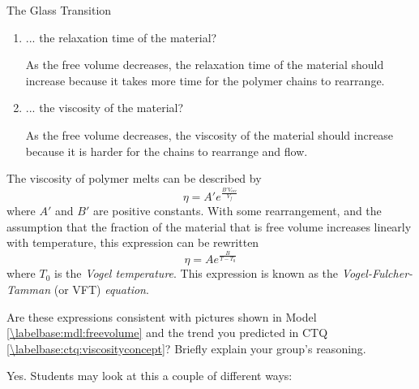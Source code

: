 \begin{activity}{The Glass Transition}
\begin{ctqs}
		\begin{enumerate}
			\item ... the relaxation time of the material?
			
				\begin{solution}[0.5in]
					As the free volume decreases, the relaxation time of the material should increase because it takes more time for the polymer chains to rearrange.
				\end{solution}
			
			\item ... the viscosity of the material?
			
				\begin{solution}[0.5in]
					As the free volume decreases, the viscosity of the material should increase because it is harder for the chains to rearrange and flow.
				\end{solution}
				
		\end{enumerate}
	
\end{ctqs}

\begin{infobox}

	The viscosity of polymer melts can be described by
	\begin{equation*}
		\eta = A' e^{\frac{B' V_{occ}}{V_f}}
	\end{equation*}
	where $A'$ and $B'$ are positive constants.  With some rearrangement, and the assumption that the fraction of the material that is free volume increases linearly with temperature, this expression can be rewritten
	\begin{equation*}
		\eta = A e^{\frac{B}{T-T_0}}
	\end{equation*}
	where $T_0$ is the \emph{Vogel temperature}.  This expression is known as the \emph{Vogel-Fulcher-Tamman} (or VFT) \emph{equation}.
			
\end{infobox}

\begin{ctqs}
		
	\question Are these expressions consistent with pictures shown in Model \ref{\labelbase:mdl:freevolume} and the trend you predicted in CTQ \ref{\labelbase:ctq:viscosityconcept}?  Briefly explain your group's reasoning.
			
				\begin{solution}[2in]
					Yes.  Students may look at this a couple of different ways:
					

\end{solution}
\end{ctqs}
\end{activity}
